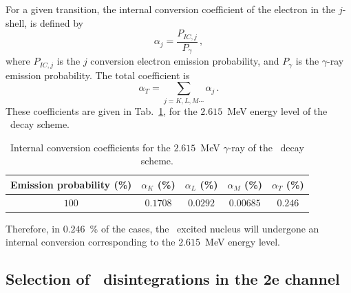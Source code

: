 For a given transition, the internal conversion coefficient of the electron in the $j$-shell, is defined by
\begin{equation}
\alpha_{j}=\frac{P_{IC, j}}{P_{\gamma}}\,,
\end{equation}
where $P_{IC,j}$ is the $j$ conversion electron emission probability, and $P_{\gamma}$ is the $\gamma$-ray emission probability.
The total coefficient is
\begin{equation}
  \alpha_{T}=\sum_{j=K,L,M\cdots}\alpha_{j}\,.
\end{equation}
These coefficients are given in Tab.~\ref{tab:IC_prob}, for the $2.615$~MeV energy level of the \Tl\ decay scheme.
\begin{table}[h]
  \centering
  \begin{tabular}{|c|c|c|c|c|}
    \hline
    Emission probability (\%) & $\alpha_{K}$ (\%) & $\alpha_{L}$ (\%) & $\alpha_{M}$ (\%) & $\alpha_{T}$ (\%) \\
    \hline\hline
    $100$ & $0.1708$ &    $0.0292$ &  $0.00685$  &    $0.246$ \\
    \hline
  \end{tabular}
  \caption{Internal conversion coefficients for the $2.615$~MeV $\gamma$-ray of the \Tl\ decay scheme.
    \label{tab:IC_prob}}
\end{table}
Therefore, in $0.246$~\% of the cases, the \Pb\ excited nucleus will undergone an internal conversion corresponding to the $2.615$~MeV energy level.


\subsection{Selection of \Tl\ disintegrations in the 2e channel}

